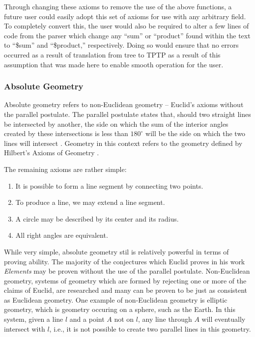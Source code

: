 Through changing these axioms to remove the use of the above functions, a future user could easily adopt this set of axioms for use with any arbitrary field. To completely convert this, the user would also be required to alter a few lines of code from the parser which change any ``sum'' or ``product'' found within the text to ``\$sum'' and ``\$product,'' respectively. Doing so would ensure that no errors occurred as a result of translation from tree to TPTP as a result of this assumption that was made here to enable smooth operation for the user.

\subsubsection{Absolute Geometry}

Absolute geometry refers to non-Euclidean geometry -- Euclid's axioms without the parallel postulate. The parallel postulate states that, should two straight lines be intersected by another, the side on which the sum of the interior angles created by these intersections is less than $180^{\circ}$ will be the side on which the two lines will intersect \cite{absolute}. Geometry in this context refers to the geometry defined by Hilbert's Axioms of Geometry \cite{Hilbert}.

The remaining axioms are rather simple:
\begin{enumerate}
	\item It is possible to form a line segment by connecting two points.
	\item To produce a line, we may extend a line segment.
	\item A circle may be described by its center and its radius.
	\item All right angles are equivalent.
\end{enumerate}

While very simple, absolute geometry stil is relatively powerful in terms of proving ability. The majority of the conjectures which Euclid proves in his work \textit{Elements} may be proven without the use of the parallel postulate. Non-Euclidean geometry, systems of geometry which are formed by rejecting one or more of the claims of Euclid, are researched and many can be proven to be just as consistent as Euclidean geometry. One example of non-Euclidean geometry is elliptic geometry, which is geometry occuring on a sphere, such as the Earth. In this system, given a line $l$ and a point $A$ not on $l$, any line through $A$ will eventually intersect with $l$, i.e., it is not possible to create two parallel lines in this geometry.

